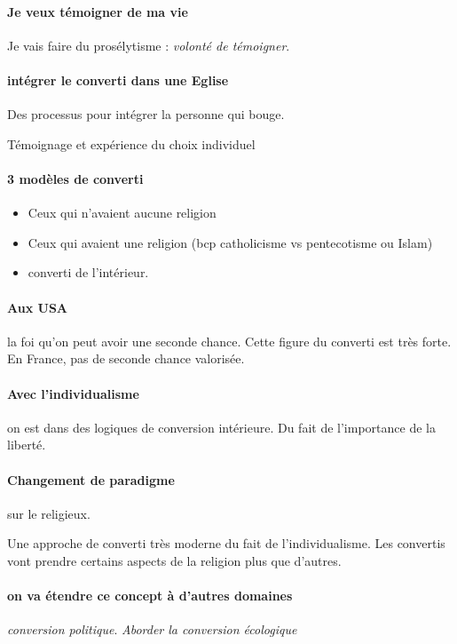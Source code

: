 \paragraph{Je veux témoigner de ma vie} Je vais faire du prosélytisme : \textit{volonté de témoigner}. 

\paragraph{intégrer le converti dans une Eglise} Des processus pour intégrer la personne qui bouge. 

Témoignage et expérience du choix individuel
\paragraph{3 modèles de converti}
\begin{itemize}
    \item Ceux qui n'avaient aucune religion
    \item Ceux qui avaient une religion (bcp catholicisme vs pentecotisme ou Islam)
    \item converti de l'intérieur.
\end{itemize}

\paragraph{Aux USA} la foi qu'on peut avoir une seconde chance. Cette figure du converti est très forte. En France, pas de seconde chance valorisée.


\paragraph{Avec l'individualisme} on est dans des logiques de conversion intérieure. Du fait de l'importance de la liberté.

\paragraph{Changement de paradigme} sur le religieux. 


\begin{Synthesis}
    Une approche de converti très moderne du fait de l'individualisme.
    Les convertis vont prendre certains aspects de la religion plus que d'autres.
    
\end{Synthesis}
\paragraph{on va étendre ce concept à d'autres domaines} \textit{conversion politique}. \textit{Aborder la conversion écologique}


